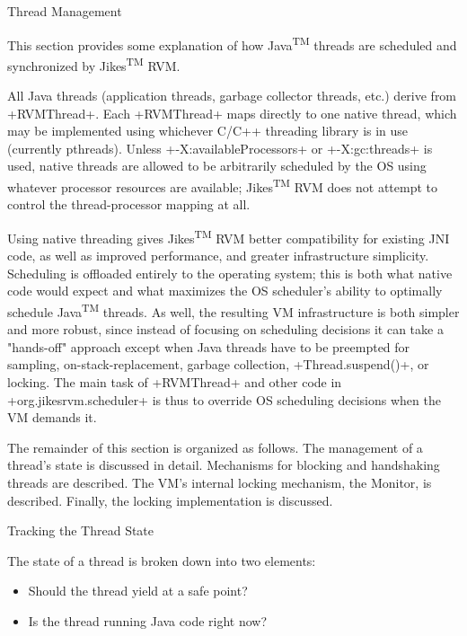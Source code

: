 \begin{section}{Thread Management}
\label{sec:threadmanagement}

This section provides some explanation of how Java\textsuperscript{TM} threads are scheduled and synchronized by Jikes\textsuperscript{TM} RVM.

All Java threads (application threads, garbage collector threads, etc.) derive from \spverb+RVMThread+. Each \spverb+RVMThread+ maps directly to one native thread, which may be implemented using whichever C/C++ threading library is in use (currently pthreads). Unless \spverb+-X:availableProcessors+ or \spverb+-X:gc:threads+ is used, native threads are allowed to be arbitrarily scheduled by the OS using whatever processor resources are available; Jikes\textsuperscript{TM} RVM does not attempt to control the thread-processor mapping at all.

Using native threading gives Jikes\textsuperscript{TM} RVM better compatibility for existing JNI code, as well as improved performance, and greater infrastructure simplicity. Scheduling is offloaded entirely to the operating system; this is both what native code would expect and what maximizes the OS scheduler's ability to optimally schedule Java\textsuperscript{TM} threads. As well, the resulting VM infrastructure is both simpler and more robust, since instead of focusing on scheduling decisions it can take a "hands-off" approach except when Java threads have to be preempted for sampling, on-stack-replacement, garbage collection, \spverb+Thread.suspend()+, or locking. The main task of \spverb+RVMThread+ and other code in \spverb+org.jikesrvm.scheduler+ is thus to override OS scheduling decisions when the VM demands it.

The remainder of this section is organized as follows. The management of a thread's state is discussed in detail. Mechanisms for blocking and handshaking threads are described. The VM's internal locking mechanism, the Monitor, is described. Finally, the locking implementation is discussed.

\begin{subsection}{Tracking the Thread State}

The state of a thread is broken down into two elements:
\begin{itemize}
  \item Should the thread yield at a safe point?
  \item Is the thread running Java code right now?
\end{itemize}


\end{subsection}
\end{section}
